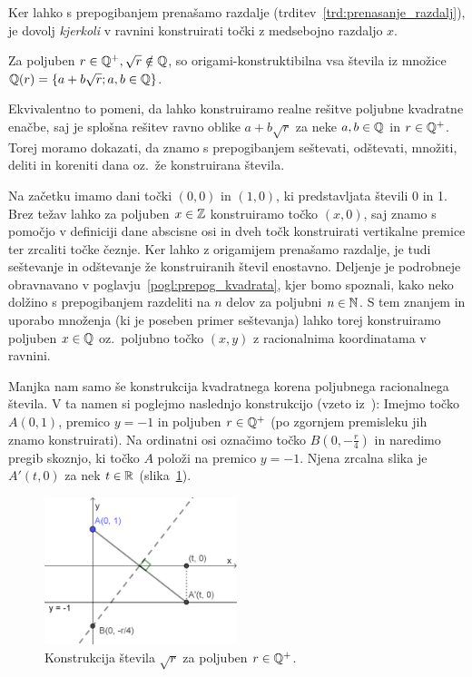 \begin{opomba}
    Ker lahko s prepogibanjem prenašamo razdalje (trditev~\ref{trd:prenasanje_razdalj}), je dovolj \emph{kjerkoli} v ravnini konstruirati točki z medsebojno razdaljo $x$.
\end{opomba}

\begin{izrek}
    \label{izr:origami_konstruktibilnost}
    Za poljuben $r \in \mathbb Q^{+}, \sqrt{r} \notin \mathbb Q$, so origami-konstruktibilna vsa števila iz množice $\mathbb Q(r) = \{a + b\sqrt{r}; a, b \in \mathbb Q\}$.
\end{izrek}

\begin{dokaz}
    Ekvivalentno to pomeni, da lahko konstruiramo realne rešitve poljubne kvadratne enačbe, saj je splošna rešitev ravno oblike $a + b\sqrt{r} $ za neke $ a, b \in \mathbb Q$ in $r \in \mathbb Q^{+}$. Torej moramo dokazati, da znamo s prepogibanjem seštevati, odštevati, množiti, deliti in koreniti dana oz.\ že konstruirana števila.
    
    Na začetku imamo dani točki $(0, 0)$ in $(1, 0)$, ki predstavljata števili 0 in 1. Brez težav lahko za poljuben $x \in \mathbb Z$ konstruiramo točko $(x, 0)$, saj znamo s pomočjo v definiciji dane abscisne osi in dveh točk konstruirati vertikalne premice ter zrcaliti točke čeznje. Ker lahko z origamijem prenašamo razdalje, je tudi seštevanje in odštevanje že konstruiranih števil enostavno. Deljenje je podrobneje obravnavano v poglavju~\ref{pogl:prepog_kvadrata}, kjer bomo spoznali, kako neko dolžino s prepogibanjem razdeliti na $n$ delov za poljubni $n \in \mathbb N$. S tem znanjem in uporabo množenja (ki je poseben primer seštevanja) lahko torej konstruiramo poljuben $x \in \mathbb Q$ oz.\ poljubno točko $(x, y)$ z racionalnima koordinatama v ravnini.
    
    Manjka nam samo še konstrukcija kvadratnega korena poljubnega racionalnega števila. V ta namen si poglejmo naslednjo konstrukcijo (vzeto iz~\cite[str.\ 58]{hull2013}):
    Imejmo točko $A (0, 1) $, premico $y = -1$ in poljuben $r \in \mathbb Q^{+}$ (po zgornjem premisleku jih znamo konstruirati). Na ordinatni osi označimo točko $B (0, -\frac{r}{4})$ in naredimo pregib skoznjo, ki točko $A$ položi na premico $y = -1$. Njena zrcalna slika je $A' (t, 0) $ za nek $t \in \mathbb R$ (slika~\ref{fig:konstrukcija_korena}).
    
    \begin{figure}[h]
        \centering
        \includegraphics[width=0.5\textwidth]{images/kvadratni_koren.png}
        \caption[Konstrukcija korena]{Konstrukcija števila $\sqrt{r}$ za poljuben $r \in \mathbb Q^{+}$.}
        \label{fig:konstrukcija_korena}
    \end{figure}
    

\end{dokaz}
